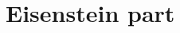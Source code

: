 \documentclass[thesis.tex]{subfiles}
\begin{document}

\section{Eisenstein part}%
\label{sec:eisenstein_part}
\end{document}
